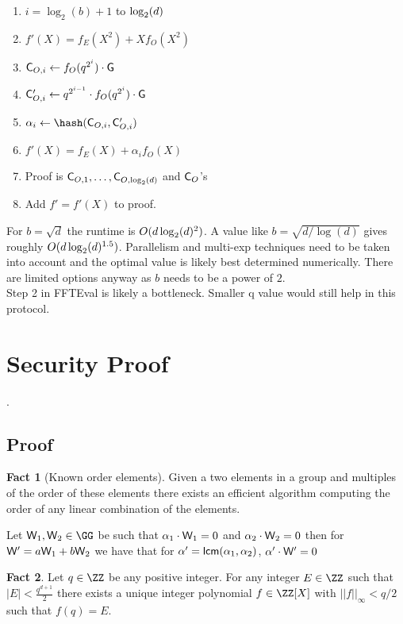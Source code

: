 \documentclass{article}
\theoremstyle{definition}
\newtheorem{fact}{Fact}
\begin{document}
\begin{mdframed}
\begin{enumerate}[nolistsep]
		\item \pcfor $i=\log_2(b)+1$ to $\log_2(d)$
		\item \pcind[1] $f'(X)=f_E(X^2)+Xf_O(X^2)$
		\item \pcind[1] $\mathsf{C}_{O,i}\gets f_O(q^{2^i}) \cdot \mathsf{G}$ 
		\item  \pcind[1] $\mathsf{C}_{O,i}'\gets q^{2^{i-1}} \cdot f_O(q^{2^i}) \cdot \mathsf{G}$ 
		\item \pcind[1] $\alpha_i\gets\hash(\gr{C}_{O,i},\gr{C}_{O,i}')$
		\item \pcind[1] $f'(X)=f_E(X)+\alpha_i f_O(X)$
		\item Proof is $\mathsf{C}_{O,1},\dots,\mathsf{C}_{O,\log_2(d)}$ and $\mathsf{C}_O$'s
		\item Add $f'=f'(X)$ to proof.
	\end{enumerate}
	\end{mdframed}
	For $b=\sqrt{d}$ the runtime is $O(d \log_2(d)^2)$. A value like $b=\sqrt{d/\log(d)}$ gives roughly $O(d\log_2(d)^{1.5})$. Parallelism and multi-exp techniques need to be taken into account and the optimal value is likely best determined numerically. There are limited options anyway as $b$ needs to be a power of $2$.\\ 
Step 2 in FFTEval is likely a bottleneck. Smaller q value would still help in this protocol.
\section{Security Proof}

.

\subsection{Proof}

\begin{fact}[Known order elements]
	\label{fact:knownorder}
	Given a two elements in a group and multiples of the order of these elements there exists an efficient algorithm computing the order of any linear combination of the elements.
\end{fact}
Let $\gr{W}_1,\gr{W}_2 \in \GG$ be such that $\alpha_1 \cdot \mathsf{W}_1=0$ and $\alpha_2 \cdot \mathsf{W}_2=0$ then for $\mathsf{W}'=a\mathsf{W}_1 + b \mathsf{W}_2$ we have that for $\alpha'=\mathsf{lcm}(\alpha_1,\alpha_2)$, $\alpha' \cdot \mathsf{W}'=0$
\begin{fact}
\label{fact:encoding}
Let $q \in \ZZ$ be any positive integer. For any integer $E \in \ZZ$ such that $|E|<\frac{q^{d+1}}{2}$ there exists a unique integer polynomial $f \in \ZZ[X]$ with $||f||_\infty < q/2$ such that $f(q) = E$. 
\end{fact} 
\end{document}
